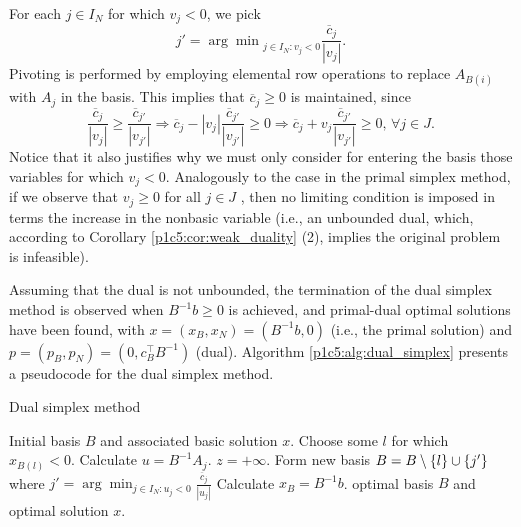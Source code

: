  For each $j \in I_N$ for which $v_j < 0$, we pick
 \begin{equation*}
 	j' = {\arg\min}_{j \in I_N : v_j < 0} \frac{\overline{c}_j}{|v_j|}.	
 \end{equation*}
 Pivoting is performed by employing elemental row operations to replace $A_{B(i)}$ with $A_j$ in the basis. This implies that $\overline{c}_j \geq 0$ is maintained, since
 \begin{equation*}
	\frac{\overline{c}_j}{|v_j|} \geq \frac{\overline{c}_{j'}}{|v_{j'}|} \Rightarrow \overline{c}_j -|v_j|\frac{\overline{c}_{j'}}{|v_{j'}|} \geq 0 \Rightarrow \overline{c}_j + v_j\frac{\overline{c}_{j'}}{|v_{j'}|} \geq 0, \, \forall j \in J.
 \end{equation*}
%
Notice that it also justifies why we must only consider for entering the basis those variables for which $v_j < 0$. Analogously to the case in the primal simplex method, if we observe that $v_j \ge 0$ for all $j \in J$ , then no limiting condition is imposed in terms the increase in the nonbasic variable (i.e., an unbounded dual, which, according to Corollary \ref{p1c5:cor:weak_duality} (2), implies the original problem is infeasible).

Assuming that the dual is not unbounded, the termination of the dual simplex method is observed when $B^{-1}b \geq 0$ is achieved, and primal-dual optimal solutions have been found, with $x = (x_B,x_N) = (B^{-1}b, 0)$ (i.e., the primal solution) and $p = (p_B, p_N) = (0, c_B^\top B^{-1})$ (dual). Algorithm \ref{p1c5:alg:dual_simplex} presents a pseudocode for the dual simplex method.

\begin{algorithm}[h]
	\caption{Dual simplex method} \label{p1c5:alg:dual_simplex}
	\begin{algorithmic}[1] %
		 Initial basis $B$ and associated basic solution $x$.
		 \label{alg:opt_condition} 
			\State Choose some $l$ for which $x_{B(l)} < 0$. Calculate $u = B^{-1}A_j$. 
			 \label{alg:unb_condition}
				 $z = +\infty$.		
			\Else
				\State Form new basis $B = B \setminus \left\{ l \right \} \cup \left\{ j' \right \}$ where $j' = \arg\min_{j \in I_N : u_j < 0} \frac{\overline{c}_j}{|u_j|}$ 
				\State Calculate $x_B = B^{-1}b$.
			\EndIf
		\EndWhile
		 optimal basis $B$ and optimal solution $x$.
	\end{algorithmic}
\end{algorithm}

